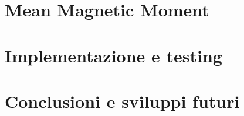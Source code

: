 \documentclass[11pt,oneside]{book}
\theoremstyle{plain}
\begin{document}
\chapter{Mean Magnetic Moment}\label{chap6}


\chapter{Implementazione e testing}\label{chap7}


\chapter{Conclusioni e sviluppi futuri}\label{chap8}






\end{document}
